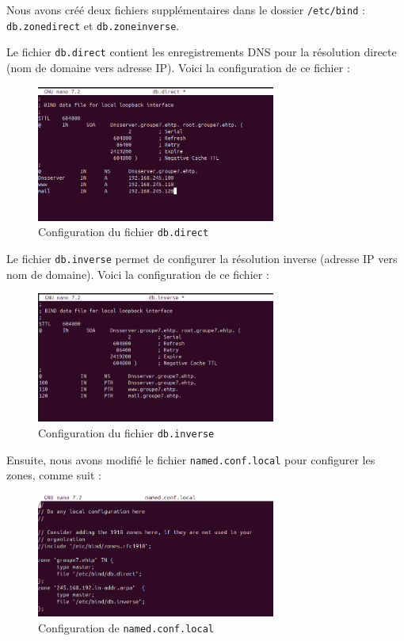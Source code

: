 	Nous avons créé deux fichiers supplémentaires dans le dossier \texttt{/etc/bind} : \texttt{db.zonedirect} et \texttt{db.zoneinverse}.
	
	Le fichier \texttt{db.direct} contient les enregistrements DNS pour la résolution directe (nom de domaine vers adresse IP). Voici la configuration de ce fichier :
	
	\begin{figure}[h]
		\centering
		\includegraphics[width=0.7\textwidth]{DNS/db-direct.png}
		\caption{Configuration du fichier \texttt{db.direct}}
		\label{fig:ridal}
	\end{figure}

	Le fichier \texttt{db.inverse} permet de configurer la résolution inverse (adresse IP vers nom de domaine). Voici la configuration de ce fichier :
	
	\begin{figure}[h]
		\centering
		\includegraphics[width=0.7\textwidth]{DNS/db-inverse.png}
		\caption{Configuration du fichier \texttt{db.inverse}}
		\label{fig:ridal}
	\end{figure}
	
	Ensuite, nous avons modifié le fichier \texttt{named.conf.local} pour configurer les zones, comme suit :
		\newpage
	\begin{figure}[h]
		\centering
		\includegraphics[width=0.7\textwidth]{DNS/named-conf-local.png}
		\caption{Configuration de \texttt{named.conf.local}}
		\label{fig:ridal}
	\end{figure}


